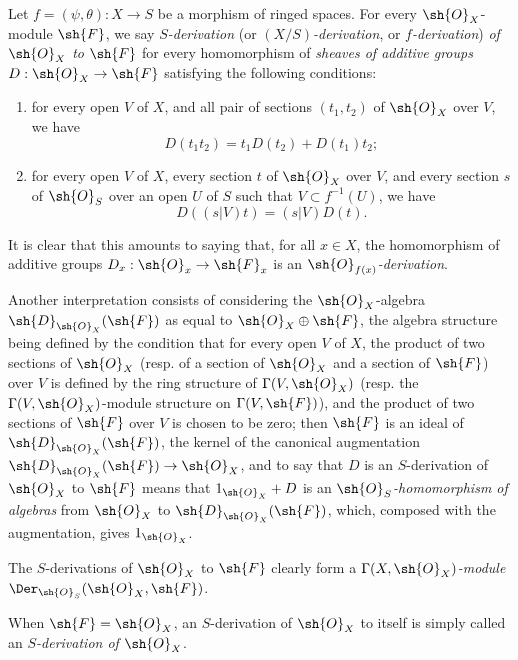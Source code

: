 \begin{env}[16.5.1]
\label{IV.16.5.1}
Let $f = (\psi, \theta) : X \to S$ be a morphism of ringed spaces.
For every $\sh{O}_X$-module $\sh{F}$, we say \emph{$S$-derivation} (or \emph{$(X/S)$-derivation}, or \emph{$f$-derivation}) \emph{of $\sh{O}_X$ to $\sh{F}$} for every homomorphism of \emph{sheaves of additive groups} $D : \sh{O}_X \to \sh{F}$ satisfying the following conditions:
\begin{enumerate}
  \item[(a)] for every open $V$ of $X$, and all pair of sections $(t_1, t_2)$ of $\sh{O}_X$ over $V$, we have
  \[
  \label{IV.16.5.1.1}
    D(t_1 t_2) = t_1 D(t_2) + D(t_1)t_2;
    \tag{16.5.1.1}
  \]
  \item[(b)] for every open $V$ of $X$, every section $t$ of $\sh{O}_X$ over $V$, and every section $s$ of $\sh{O}_S$ over an open $U$ of $S$ such that $V \subset f^{-1}(U)$, we have
  \[
  \label{IV.16.5.1.2}
    D((s|V)t) = (s|V)D(t).
    \tag{16.5.1.2}
  \]
\end{enumerate}
It is clear that this amounts to saying that, for all $x \in X$, the homomorphism of additive groups $D_x : \sh{O}_x \to \sh{F}_x$ is an \emph{$\sh{O}_{f(x)}$-derivation}.

Another interpretation consists of considering the $\sh{O}_X$-algebra $\sh{D}_{\sh{O}_X}(\sh{F})$ as equal to $\sh{O}_X \oplus \sh{F}$, the algebra structure being defined by the condition that for every open $V$ of $X$, the product of two sections of $\sh{O}_X$ (resp. of a section of $\sh{O}_X$ and a section of $\sh{F}$) over $V$ is defined by the ring structure of $\Gamma(V, \sh{O}_X)$ (resp. the $\Gamma(V, \sh{O}_X)$-module structure on $\Gamma(V, \sh{F})$), and the product of two sections of $\sh{F}$ over $V$ is chosen to be zero;
then $\sh{F}$ is an ideal of $\sh{D}_{\sh{O}_X}(\sh{F})$, the kernel of the canonical augmentation $\sh{D}_{\sh{O}_X}(\sh{F}) \to \sh{O}_X$, and to say that $D$ is an $S$-derivation of $\sh{O}_X$ to $\sh{F}$ means that $1_{\sh{O}_X} + D$ is an \emph{$\sh{O}_S$-homomorphism of algebras} from $\sh{O}_X$ to $\sh{D}_{\sh{O}_X}(\sh{F})$, which, composed with the augmentation, gives $1_{\sh{O}_X}$.

The $S$-derivations of $\sh{O}_X$ to $\sh{F}$ clearly form a \emph{$\Gamma(X, \sh{O}_X)$-module} $\Der_{\sh{O}_S}(\sh{O}_X, \sh{F})$.

When $\sh{F} = \sh{O}_X$, an $S$-derivation of $\sh{O}_X$ to itself is simply called an \emph{$S$-derivation of $\sh{O}_X$}.
\end{env}

